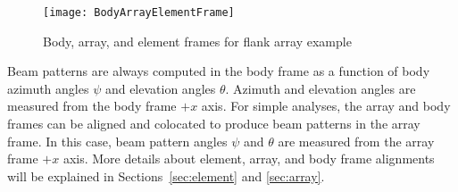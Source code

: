 \begin{figure}[!ht]
\begin{center}
\texttt{[image: BodyArrayElementFrame]}
\caption{\label{fig:ReferenceFrames}Body, array, and element frames for flank array example}
\end{center}
\end{figure}

Beam patterns are always computed in the body frame as a function of body azimuth angles $\psi$ and elevation angles $\theta$. Azimuth and elevation angles are measured from the body frame $+x$ axis. For simple analyses, the array and body frames can be aligned and colocated to produce beam patterns in the array frame. In this case, beam pattern angles $\psi$ and $\theta$ are measured from the array frame $+x$ axis. More details about element, array, and body frame alignments will be explained in Sections~\ref{sec:element} and \ref{sec:array}.
